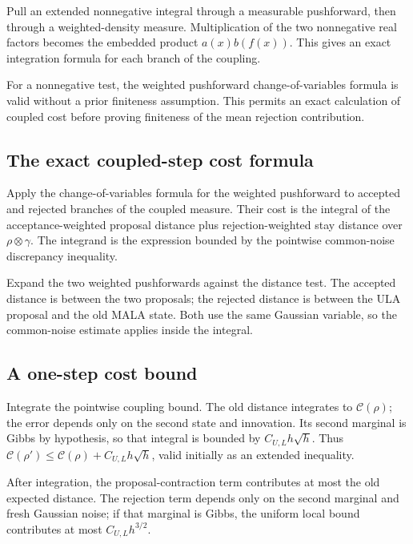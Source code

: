 \documentclass[11pt,a4paper]{report}
\begin{document}
Pull an extended nonnegative integral through a measurable pushforward, then through a weighted-density measure. Multiplication of the two nonnegative real factors becomes the embedded product \(a(x)b(f(x))\). This gives an exact integration formula for each branch of the coupling.



For a nonnegative test, the weighted pushforward change-of-variables formula is valid without a prior finiteness assumption. This permits an exact calculation of coupled cost before proving finiteness of the mean rejection contribution.

\subsection{\texorpdfstring{The exact coupled-step cost formula}{The exact coupled-step cost formula}}
\label{report-step-UnadjustedLangevin-MALACoupling-lean-22}


Apply the change-of-variables formula for the weighted pushforward to accepted and rejected branches of the coupled measure. Their cost is the integral of the acceptance-weighted proposal distance plus rejection-weighted stay distance over \(\rho\otimes\gamma\). The integrand is the expression bounded by the pointwise common-noise discrepancy inequality.



Expand the two weighted pushforwards against the distance test. The accepted distance is between the two proposals; the rejected distance is between the ULA proposal and the old MALA state. Both use the same Gaussian variable, so the common-noise estimate applies inside the integral.

\subsection{\texorpdfstring{A one-step cost bound}{A one-step cost bound}}
\label{report-step-UnadjustedLangevin-MALACoupling-lean-23}


Integrate the pointwise coupling bound. The old distance integrates to \(\mathcal C(\rho)\); the error depends only on the second state and innovation. Its second marginal is Gibbs by hypothesis, so that integral is bounded by \(C_{U,L}h\sqrt h\). Thus \(\mathcal C(\rho')\le\mathcal C(\rho)+C_{U,L}h\sqrt h\), valid initially as an extended inequality.



After integration, the proposal-contraction term contributes at most the old expected distance. The rejection term depends only on the second marginal and fresh Gaussian noise; if that marginal is Gibbs, the uniform local bound contributes at most \(C_{U,L}h^{3/2}\).
\end{document}
